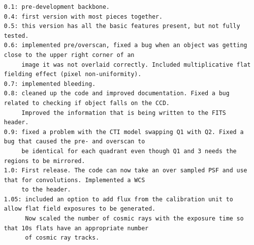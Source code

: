 \documentclass[a4paper,12pt,english]{sphinxmanual}
\begin{document}
\begin{Verbatim}[commandchars=\\\{\}]
0.1: pre-development backbone.
0.4: first version with most pieces together.
0.5: this version has all the basic features present, but not fully tested.
0.6: implemented pre/overscan, fixed a bug when an object was getting close to the upper right corner of an
     image it was not overlaid correctly. Included multiplicative flat fielding effect (pixel non-uniformity).
0.7: implemented bleeding.
0.8: cleaned up the code and improved documentation. Fixed a bug related to checking if object falls on the CCD.
     Improved the information that is being written to the FITS header.
0.9: fixed a problem with the CTI model swapping Q1 with Q2. Fixed a bug that caused the pre- and overscan to
     be identical for each quadrant even though Q1 and 3 needs the regions to be mirrored.
1.0: First release. The code can now take an over sampled PSF and use that for convolutions. Implemented a WCS
     to the header.
1.05: included an option to add flux from the calibration unit to allow flat field exposures to be generated.
      Now scaled the number of cosmic rays with the exposure time so that 10s flats have an appropriate number
      of cosmic ray tracks.
\end{Verbatim}
\end{document}
